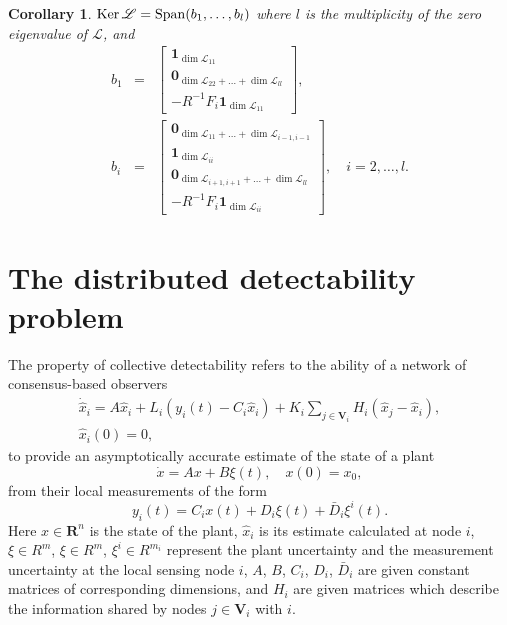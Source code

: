 \documentclass[a4paper,10pt,conference]{ieeeconf}
\newtheorem{corollary}{Corollary}
\begin{document}
\begin{corollary}\label{L.eigenvectors}
$    \mathop{\mathrm{Ker}}\nolimits\mathcal{L}=\mathrm{Span}(b_1,\ldots,b_l)$
where $l$ is the multiplicity of the zero eigenvalue of $\mathcal{L}$, and 
\begin{eqnarray*}
b_1&=&\left[\begin{array}{c}
   \mathbf{1}_{\dim{\mathcal{L}_{11}}} \\ 
\mathbf{0}_{\dim{\mathcal{L}_{22}}+\ldots+
\dim{\mathcal{L}_{ll}}} \\
    -R^{-1}F_i\mathbf{1}_{\dim{\mathcal{L}_{11}}} 
  \end{array}\right], \\
b_i&=&\left[\begin{array}{c}
\mathbf{0}_{\dim{\mathcal{L}_{11}}+\ldots+
\dim{\mathcal{L}_{i-1,i-1}}} \\
   \mathbf{1}_{\dim{\mathcal{L}_{ii}}} \\ 
\mathbf{0}_{\dim{\mathcal{L}_{i+1,i+1}}+\ldots+
\dim{\mathcal{L}_{ll}}} \\
    -R^{-1}F_i\mathbf{1}_{\dim{\mathcal{L}_{ii}}} 
  \end{array}\right], \quad i=2,\ldots,l.
\end{eqnarray*}
\end{corollary}
\mbox{}

\section{The distributed detectability problem}\label{main}

The property of collective detectability refers to the ability of a network
of consensus-based observers 
 \begin{eqnarray}
    \dot{\hat x}_i=A\hat x_i + L_i(y_i(t)-C_{i}\hat x_i)+K_i\sum_{j\in
      \mathbf{V}_i}H_i(\hat x_j-\hat x_i),   \label{UP7.C.d}
\\
 \hat x_i(0)=0, \nonumber
\end{eqnarray}
to provide an asymptotically accurate estimate of the state of a plant 
\begin{equation}
  \label{eq:plant}
  \dot x=Ax+B\xi(t), \quad x(0)=x_0,
\end{equation}
from their local measurements of the form 
\begin{equation}\label{U6.yi}
y_i(t)=C_{i}x(t)+D_{i}\xi(t)+{\bar D_{i}}\xi^i(t). 
\end{equation}
Here $x\in\mathbf{R}^n$ is the state of the plant, $ \hat{x}_i$ is its 
estimate calculated at node $i$, $\xi\in {R}^m$, $\xi\in {R}^m$, ${\xi^i}\in {R}^{m_i}$ represent the plant
uncertainty and the measurement uncertainty at the local sensing node $i$,
$A$, $B$, $C_i$, $D_i$, $\bar D_i$ are given constant matrices of
corresponding dimensions, and $H_i$ are given matrices
which describe the information shared by nodes $j\in\mathbf{V}_i$ with
$i$. 
\end{document}
